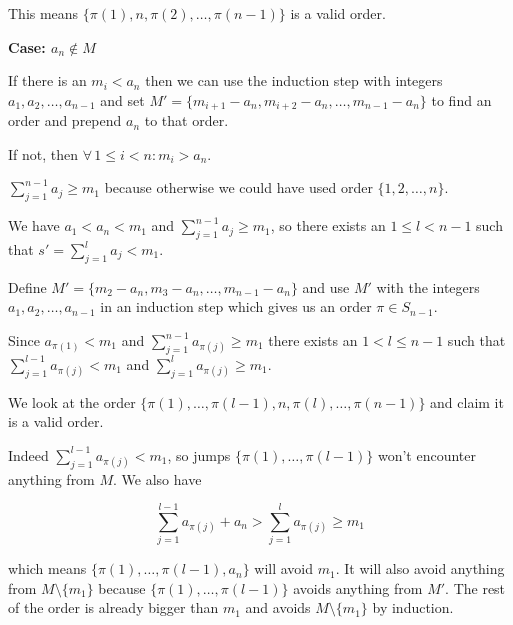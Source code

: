 This means $\{\pi(1), n, \pi(2), \ldots, \pi(n-1)\}$ is a valid order.

\noindent \textbf{Case: $a_n \notin M$}

If there is an $m_i < a_n$ then we can use the induction step with integers $a_1, a_2, \ldots, a_{n-1}$ and set $ M' = \{m_{i+1} - a_n, m_{i + 2} - a_n, \ldots, m_{n-1} - a_n\}$ to find an order and prepend $a_n$ to that order.

If not, then $\forall\, 1 \leq i < n: m_i > a_n$.

$\sum_{j = 1}^{n-1} a_j \geq m_1$ because otherwise we could have used order $\{1, 2, \ldots, n\}$.

We have $a_1 < a_n < m_1$ and $\sum_{j = 1}^{n-1} a_j \geq m_1$, so there exists an $1 \leq l < n - 1$ such that $s' = \sum_{j = 1}^l a_j < m_1$.

Define $M' = \{m_2 - a_n, m_3 - a_n, \ldots, m_{n-1} - a_n\}$ and use $M'$ with the integers $a_1, a_2, \ldots, a_{n-1}$ in an induction step which gives us an order $\pi \in S_{n-1}$.

Since $a_{\pi(1)} < m_1$ and $\sum_{j = 1}^{n-1} a_{\pi(j)} \geq m_1$ there exists an $1 < l \leq n - 1$ such that $\sum_{j = 1}^{l-1} a_{\pi(j)} < m_1$ and $\sum_{j = 1}^{l} a_{\pi(j)} \geq m_1$.


We look at the order $\{\pi(1), \ldots, \pi(l-1), n, \pi(l), \ldots, \pi(n-1)\}$ and claim it is a valid order.

Indeed $\sum_{j = 1}^{l-1} a_{\pi(j)} < m_1$, so jumps $\{\pi(1), \ldots, \pi(l-1)\}$ won't encounter anything from $M$. We also have

$$
\sum_{j = 1}^{l-1} a_{\pi(j)} + a_n > \sum_{j = 1}^{l} a_{\pi(j)} \geq m_1
$$

which means $\{\pi(1), \ldots, \pi(l-1), a_n\}$ will avoid $m_1$. It will also avoid anything from $M \setminus \{m_1\}$ because $\{\pi(1), \ldots, \pi(l-1)\}$ avoids anything from $M'$. The rest of the order is already bigger than $m_1$ and avoids $M \setminus \{m_1\}$ by induction.
